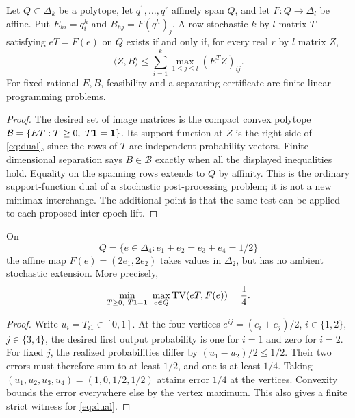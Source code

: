 \begin{theorem}\label{thm:extension-dual}
Let $Q\subset\Delta_k$ be a polytope, let $q^1,\ldots,q^r$ affinely
span $Q$, and let $F:Q\to\Delta_l$ be affine. Put $E_{hi}=q^h_i$
and $B_{hj}=F(q^h)_j$. A row-stochastic $k$ by $l$ matrix $T$ satisfying
$eT=F(e)$ on $Q$ exists if and only if, for every real $r$ by $l$ matrix
$Z$,
\begin{equation}\label{eq:dual}
 \langle Z,B\rangle\le
             \sum_{i=1}^k\max_{1\le j\le l}(E^TZ)_{ij}.
\end{equation}
For fixed rational $E,B$, feasibility and a separating certificate are
finite linear-programming problems.
\end{theorem}
\begin{proof}
The desired set of image matrices is the compact convex polytope
$\mathcal B=\{ET:T\ge0,\ T\one=\one\}$. Its support function at $Z$
is the right side of \eqref{eq:dual}, since the rows of $T$ are
independent probability vectors. Finite-dimensional separation says
$B\in\mathcal B$ exactly when all the displayed inequalities hold.
Equality on the spanning rows extends to $Q$ by affinity. This is the
ordinary support-function dual of a stochastic post-processing problem;
it is not a new minimax interchange. The additional point is that the
same test can be applied to each proposed inter-epoch lift.
\end{proof}

\begin{proposition}\label{prop:extension-gap}
On
\[
 Q=\{e\in\Delta_4:e_1+e_2=e_3+e_4=1/2\}
\]
the affine map $F(e)=(2e_1,2e_2)$ takes values in $\Delta_2$, but has
no ambient stochastic extension. More precisely,
\begin{equation}\label{eq:quarter}
 \min_{T\ge0,\ T\mathbf 1=\mathbf 1}\ \max_{e\in Q}\operatorname{TV}(eT,F(e))=\frac14.
\end{equation}
\end{proposition}
\begin{proof}
Write $u_i=T_{i1}\in[0,1]$. At the four vertices
$e^{ij}=(e_i+e_j)/2$, $i\in\{1,2\}$, $j\in\{3,4\}$, the desired
first output probability is one for $i=1$ and zero for $i=2$.
For fixed $j$, the realized probabilities differ by
$(u_1-u_2)/2\le1/2$. Their two errors must therefore sum to at least
$1/2$, and one is at least $1/4$.
Taking $(u_1,u_2,u_3,u_4)=(1,0,1/2,1/2)$ attains error $1/4$
at the vertices. Convexity bounds the error everywhere else by the
vertex maximum. This also gives a finite strict witness for
\eqref{eq:dual}.
\end{proof}

